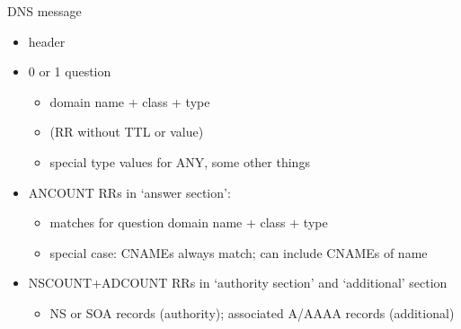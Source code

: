 \begin{frame}{DNS message}
    \begin{itemize}
    \item header
    \item 0 or 1 question
        \begin{itemize}
        \item domain name + class + type
        \item (RR without TTL or value)
        \item special type values for ANY, some other things
        \end{itemize}
    \item ANCOUNT RRs in `answer section':
        \begin{itemize}
        \item matches for question domain name + class + type 
        \item special case: CNAMEs always match; can include CNAMEs of name
        \end{itemize}
    \item NSCOUNT+ADCOUNT RRs in `authority section' and `additional' section
        \begin{itemize}
        \item NS or SOA records (authority); associated A/AAAA records (additional)
        \end{itemize}
    \end{itemize}
\end{frame}
